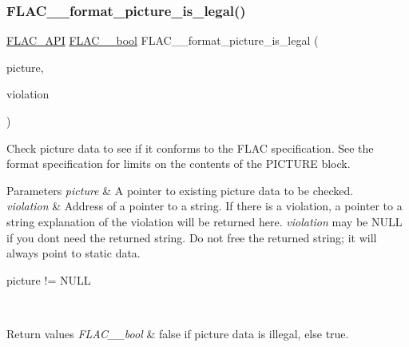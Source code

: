 \subsubsection{\texorpdfstring{F\+L\+A\+C\+\_\+\+\_\+format\+\_\+picture\+\_\+is\+\_\+legal()}{FLAC\_\_format\_picture\_is\_legal()}}
{\footnotesize\ttfamily \hyperlink{group__flac__export_ga56ca07df8a23310707732b1c0007d6f5}{F\+L\+A\+C\+\_\+\+A\+PI} \hyperlink{ordinals_8h_a95103469f1cbd78b8cf250194985b34e}{F\+L\+A\+C\+\_\+\+\_\+bool} F\+L\+A\+C\+\_\+\+\_\+format\+\_\+picture\+\_\+is\+\_\+legal (\begin{DoxyParamCaption}\item[{\hyperlink{zconf_8h_a2c212835823e3c54a8ab6d95c652660e}{const} \hyperlink{struct_f_l_a_c_____stream_metadata___picture}{F\+L\+A\+C\+\_\+\+\_\+\+Stream\+Metadata\+\_\+\+Picture} $\ast$}]{picture,  }\item[{\hyperlink{zconf_8h_a2c212835823e3c54a8ab6d95c652660e}{const} char $\ast$$\ast$}]{violation }\end{DoxyParamCaption})}

Check picture data to see if it conforms to the F\+L\+AC specification. See the format specification for limits on the contents of the P\+I\+C\+T\+U\+RE block.


\begin{DoxyParams}{Parameters}
{\em picture} & A pointer to existing picture data to be checked. \\
\hline
{\em violation} & Address of a pointer to a string. If there is a violation, a pointer to a string explanation of the violation will be returned here. {\itshape violation} may be {\ttfamily N\+U\+LL} if you don\textquotesingle{}t need the returned string. Do not free the returned string; it will always point to static data.  
\begin{DoxyCode}
picture != NULL 
\end{DoxyCode}
 \\
\hline
\end{DoxyParams}

\begin{DoxyRetVals}{Return values}
{\em F\+L\+A\+C\+\_\+\+\_\+bool} & {\ttfamily false} if picture data is illegal, else {\ttfamily true}. \\
\hline
\end{DoxyRetVals}
\mbox{\label{group__flac__format_ga996f8732a2502ad79a68bb4a9f945235}} 
